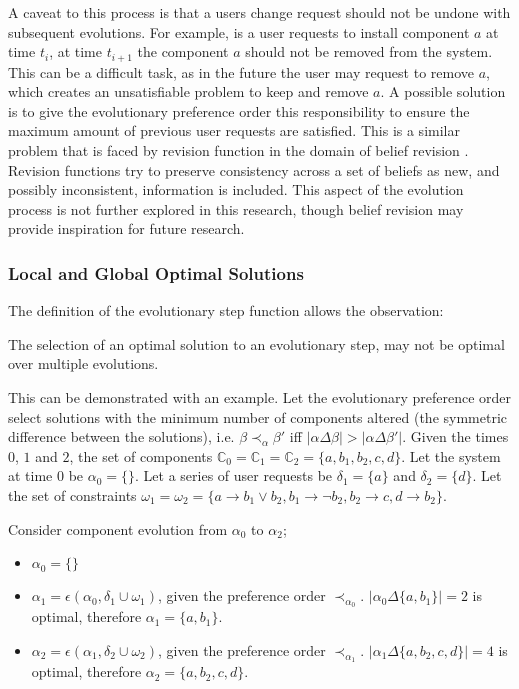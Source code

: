 A caveat to this process is that a users change request should not be undone with subsequent evolutions.
For example, is a user requests to install component $a$ at time $t_{i}$, at time $t_{i+1}$ the component $a$ should not be removed from the system.
This can be a difficult task, as in the future the user may request to remove $a$, which creates an unsatisfiable problem to keep and remove $a$.
A possible solution is to give the evolutionary preference order this responsibility to ensure the maximum amount of previous user requests are satisfied.
This is a similar problem that is faced by revision function in the domain of belief revision \citep{alchourron1985logic}.
Revision functions try to preserve consistency across a set of beliefs as new, and possibly inconsistent, information is included. 
This aspect of the evolution process is not further explored in this research, though belief revision may provide inspiration for future research.

\subsubsection{Local and Global Optimal Solutions}
The definition of the evolutionary step function allows the observation:
\begin{obs}
The selection of an optimal solution to an evolutionary step, may not be optimal over multiple evolutions.
\end{obs}

This can be demonstrated with an example.
Let the evolutionary preference order select solutions with the minimum number of components altered (the symmetric difference between the solutions), 
i.e. $\beta \prec_{\alpha} \beta'$ iff $|\alpha \Delta \beta| > |\alpha \Delta \beta'|$.
Given the times $0$, $1$ and $2$, the set of components $\mathbb{C}_0 = \mathbb{C}_1 = \mathbb{C}_2 = \{a,b_1,b_2,c,d\}$.
Let the system at time $0$ be $\alpha_0 = \{\}$.
Let a series of user requests be $\delta_1 = \{a\}$ and $ \delta_2 = \{d\}$. 
Let the set of constraints $\omega_1 = \omega_2 = \{a \rightarrow b_1 \vee b_2, b_1 \rightarrow \neg b_2, b_2 \rightarrow c, d \rightarrow b_2\}$.

Consider component evolution from $\alpha_0$ to $\alpha_2$;
\begin{itemize}
  \item $\alpha_0 = \{\}$
  \item $\alpha_1 = \epsilon(\alpha_0,\delta_1 \cup \omega_1)$, given the preference order $\prec_{\alpha_0}$. $|\alpha_0 \Delta \{a,b_1\}| = 2$ is optimal, therefore $\alpha_1 = \{a,b_1\}$.
  \item $\alpha_2 = \epsilon(\alpha_1,\delta_2 \cup \omega_2)$, given the preference order $\prec_{\alpha_1}$. $|\alpha_1 \Delta \{a,b_2,c,d\}| = 4$ is optimal, therefore $\alpha_2 = \{a,b_2,c,d\}$.
\end{itemize}


